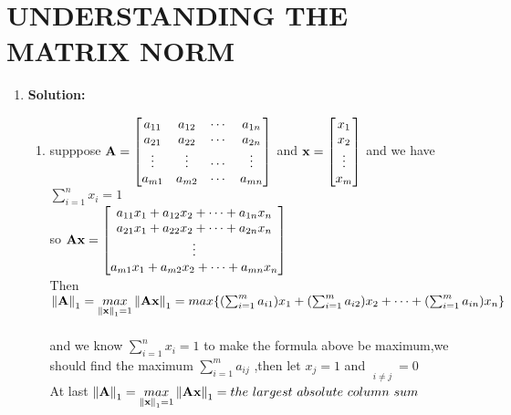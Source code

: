 \documentclass[english,onecolumn,UTF8]{IEEEtran}
\begin{document}
\section{UNDERSTANDING THE MATRIX NORM}

\begin{enumerate}
	
	\item \textbf{Solution:}
	\begin{enumerate}
	\item supppose $\bold A =\begin{bmatrix}a_{11} & a_{12} & \cdots & a_{1n} \\ a_{21} & a_{22} & \cdots & a_{2n} \\ \vdots & \vdots & \cdots & \vdots \\ a_{m1} & a_{m2} & \cdots & a_{mn}\end{bmatrix}$ and $\bold x =\begin{bmatrix}x_{1}\\ x_{2}\\ \vdots \\ x_{m}\end{bmatrix}$ and we have $\sum_{i=1}^n x_i=1$
\\so $\bold {Ax}= \begin{bmatrix}a_{11}x_{1}+a_{12}x_{2}+\cdots +a_{1n}x_{n}\\ a_{21}x_{1}+a_{22}x_{2}+\cdots +a_{2n}x_{n}\\ \vdots \\a_{m1}x_{1}+a_{m2}x_{2}+\cdots +a_{mn}x_{n}\end{bmatrix}$
\\Then $\left \| \bold A \right \|_1= \mathop{max}\limits_{\left \| \bold {x} \right \|_1=1}\left \| \bold {Ax} \right \|_1=max\{ (\sum_{i=1}^m a_{i1})x_1+(\sum_{i=1}^m a_{i2})x_2+\cdots +(\sum_{i=1}^m a_{in})x_n \}$\\
\\and we know $\sum_{i=1}^n x_i=1$ to make the formula above be maximum,we should find the maximum $\sum_{i=1}^m a_{ij}$ ,then let $x_j =1$ and $\mathop{x_i}\limits_{i \not= j }=0$
\\At last $\left \| \bold A \right \|_1= \mathop{max}\limits_{\left \| \bold {x} \right \|_1=1}\left \| \bold {Ax} \right \|_1= the\  largest\  absolute\  column\  sum$




\end{enumerate}
\end{enumerate}
\end{document}

